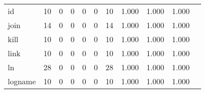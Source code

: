 \begin{longtable}{lp{1.2cm}p{1.2cm}p{1.2cm}p{1.2cm}p{1.2cm}p{1.2cm}p{1.2cm}p{1.2cm}p{1.2cm}p{1.2cm}}
id        &                                    10 &                                                  0 &                                                  0 &                                                  0 &                                                  0 &                                                 10 &                                              1.000 &                                              1.000 &                                              1.000 \\
join      &                                    14 &                                                  0 &                                                  0 &                                                  0 &                                                  0 &                                                 14 &                                              1.000 &                                              1.000 &                                              1.000 \\
kill      &                                    10 &                                                  0 &                                                  0 &                                                  0 &                                                  0 &                                                 10 &                                              1.000 &                                              1.000 &                                              1.000 \\
link      &                                    10 &                                                  0 &                                                  0 &                                                  0 &                                                  0 &                                                 10 &                                              1.000 &                                              1.000 &                                              1.000 \\
ln        &                                    28 &                                                  0 &                                                  0 &                                                  0 &                                                  0 &                                                 28 &                                              1.000 &                                              1.000 &                                              1.000 \\
logname   &                                    10 &                                                  0 &                                                  0 &                                                  0 &                                                  0 &                                                 10 &                                              1.000 &                                              1.000 &                                              1.000 \\

\end{longtable}
